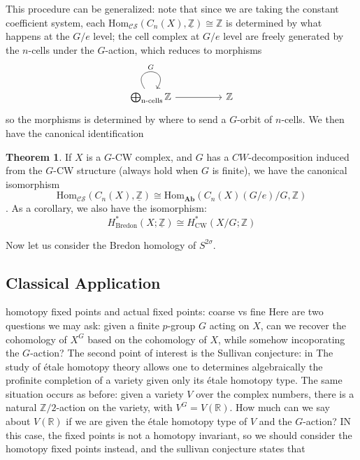 \documentclass{article}
\theoremstyle{definition}
\newtheorem{theorem}{Theorem}[section]
\theoremstyle{definition}
\theoremstyle{definition}
\theoremstyle{definition}
\theoremstyle{definition}
\theoremstyle{definition}
\theoremstyle{definition}
\begin{document}
This procedure can be generalized: note that since we are taking the constant coefficient system, each $\textrm{Hom}_{\mathcal{CS}}(C_n(X),\underline{\mathbb{Z}})\cong \mathbb{Z}$ is determined by what happens at the $G/e$ level; the cell complex at $G/e$ level are freely generated by the $n$-cells under the $G$-action, which reduces to morphisms 
\[\begin{tikzcd}
	{\bigoplus_{\textrm{n-cells}}\mathbb{Z}} && {\mathbb{Z}}
	\arrow["G", from=1-1, to=1-1, loop, in=55, out=125, distance=10mm]
	\arrow[from=1-1, to=1-3]
\end{tikzcd}\]
so the morphisms is determined by where to send a $G$-orbit of $n$-cells. We then have the canonical identification 
 
 \begin{tcolorbox}[colback=red!5!white,colframe=red!30!white]
 \begin{theorem}
 If $X$ is a $G$-CW complex, and $G$ has a $CW$-decomposition induced from the $G$-CW structure (always hold when $G$ is finite), we have the canonical isomorphism 
\[\textrm{Hom}_{\mathcal{CS}}(C_n(X),\underline{\mathbb{Z}})\cong \textrm{Hom}_{\textbf{Ab}}(C_n(X)(G/e)/G,\mathbb{Z})\]. As a corollary, we also have the isomorphism:
 \[H^*_{\textrm{Bredon}}(X;\underline{\mathbb{Z}})\cong H^*_{\textrm{CW}}(X/G;\mathbb{Z})\]
 \end{theorem}
 \end{tcolorbox}

Now let us consider the Bredon homology of $S^{2\sigma}$.








\subsection{Classical Application}
homotopy fixed points and actual fixed points: coarse vs fine
Here are two questions we may ask: given a finite $p$-group $G$ acting on $X$, can we recover the cohomology of $X^G$ based on the cohomology of $X$, while somehow incoporating the $G$-action? The second point of interest is the Sullivan conjecture: in  The study of \'etale homotopy theory allows one to determines algebraically the profinite completion of a variety given only its \'etale homotopy type. The same situation occurs as before: given a variety $V$ over the complex numbers, there is a natural $\mathbb{Z}/2$-action on the variety, with $V^G=V(\mathbb{R})$. How much can we say about $V(\mathbb{R})$ if we are given the \'etale homotopy type of $V$ and the $G$-action? IN this case, the fixed points is not a homotopy invariant, so we should consider the homotopy fixed points instead, and the sullivan conjecture states that 
\end{document}
